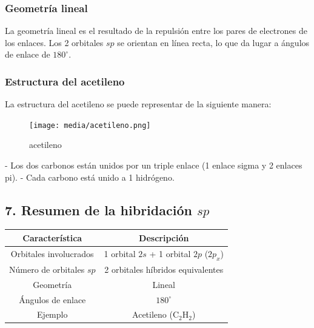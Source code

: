 \documentclass{article}
\begin{document}
\subsubsection{Geometría lineal}
La geometría lineal es el resultado de la repulsión entre los pares de electrones de los enlaces. Los 2 orbitales \( sp \) se orientan en línea recta, lo que da lugar a ángulos de enlace de \( 180^\circ \).

\subsubsection{Estructura del acetileno}
La estructura del acetileno se puede representar de la siguiente manera:

\begin{figure}[h]
    \centering
    \texttt{[image: media/acetileno.png]}
    \caption{acetileno}
    \label{fig:acetileno}
\end{figure}

- Los dos carbonos están unidos por un triple enlace (1 enlace sigma y 2 enlaces pi).
- Cada carbono está unido a 1 hidrógeno.

\subsection*{7. Resumen de la hibridación \( sp \)}
\begin{table}[h!]
\centering
\begin{tabular}{|c|c|}
\hline
\textbf{Característica} & \textbf{Descripción} \\
\hline
Orbitales involucrados & 1 orbital \( 2s \) + 1 orbital \( 2p \) (\( 2p_x \)) \\
\hline
Número de orbitales \( sp \) & 2 orbitales híbridos equivalentes \\
\hline
Geometría & Lineal \\
\hline
Ángulos de enlace & \( 180^\circ \) \\
\hline
Ejemplo & Acetileno (\( \text{C}_2\text{H}_2 \)) \\
\hline
\end{tabular}
\end{table}
\end{document}
